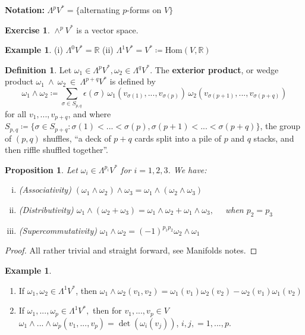 \documentclass[10pt]{article}
\theoremstyle{plain}
\newtheorem{prop}[thm]{Proposition}
\theoremstyle{definition}
\newtheorem{defn}[thm]{Definition} %
\newtheorem{exmp}[thm]{Example} %
\newtheorem{exercise}[thm]{Exercise}
\newcommand{\Notation}{\textbf{Notation: }}
\newcommand{\Real}{\mathbb{R}}
\newcommand{\setform}[2]{\Lambda^{#1} {#2}}
\newcommand{\Hom}[2]{\text{Hom}\left(#1,#2\right)}
\newcommand{\allthevs}[2]{v_{#1},...,v_{#2}}
\newcommand{\wedgge}{\omega_1\wedge\omega_2}
\begin{document}
\noindent
\Notation $\Lambda^p V^* = \{$alternating $p$-forms on $V\}$
\begin{exercise}
$\wedge^p V^*$ is a vector space.
\end{exercise}
\begin{exmp}
 (i) $\Lambda^0 V^* = \Real$ \quad (ii) $\Lambda^1V^* = V^* \coloneqq \Hom{V}{\Real}$
\end{exmp}
\begin{defn}
Let $\omega_1 \in \setform{p}{V^*}, \omega_2 \in \setform{q}{V^*}$. The \textbf{exterior product}, or wedge product $\omega_1~\wedge~\omega_2~\in~\setform{p+q}{V^*}$ is defined by
$$\omega_1\wedge\omega_2 \coloneqq \sum\limits_{\sigma \in S_{p,q}}\epsilon(\sigma)\, \omega_1(\allthevs{\sigma(1)}{\sigma(p)})\,\omega_2(\allthevs{\sigma(p+1)}{\sigma(p+q)})$$
for all $\allthevs{1}{p+q}$, and where $ S_{p,q} \coloneqq \{ \sigma \in S_{p+q} : \sigma(1)<...<\sigma(p),\sigma(p+1)<...<\sigma(p+q)\} $, the group of $(p,q)$ shuffles,  ``a deck of $p+q$ cards split into a pile of $p$ and $q$ stacks, and then riffle shuffled together''.
\end{defn}
\begin{prop}
Let $\omega_i \in \setform{p_i}{V^*}$ for $i = 1,2,3$. We have:
\begin{enumerate}[(i)]
    \item (Associativity) $(\omega_1\wedge\omega_2)\wedge\omega_3 =\omega_1\wedge(\omega_2\wedge\omega_3 ) $
    \item (Distributivity) $\omega_1\wedge(\omega_2+ \omega_3) = \omega_1\wedge\omega_2 + \omega_1\wedge\omega_3,\quad$ when $p_2 = p_3$
    \item (Supercommutativity) $\omega_1\wedge\omega_2 = (-1)^{p_1 p_2}\omega_2\wedge\omega_1$ 
\end{enumerate}
\end{prop}
\begin{proof}
All rather trivial and straight forward, see Manifolds notes.
\end{proof}
\begin{exmp}\noindent
\begin{enumerate}[($i$)]
    \item If $\omega_1,\omega_2 \in \setform{1}{V^*}$, then $\wedgge(v_1,v_2) =\omega_1(v_1)\omega_2(v_2) - \omega_2(v_1)\omega_1(v_2)$
    \item If $\omega_1,...,\omega_p \in \setform{1}{V^*},$ then for $\allthevs{1}{p}\in V$ $\omega_1\wedge...\wedge\omega_p(\allthevs{1}{p}) = \det(\omega_i(v_j))$, $i,j, = 1,...,p$.
\end{enumerate}
\end{exmp}
\end{document}
